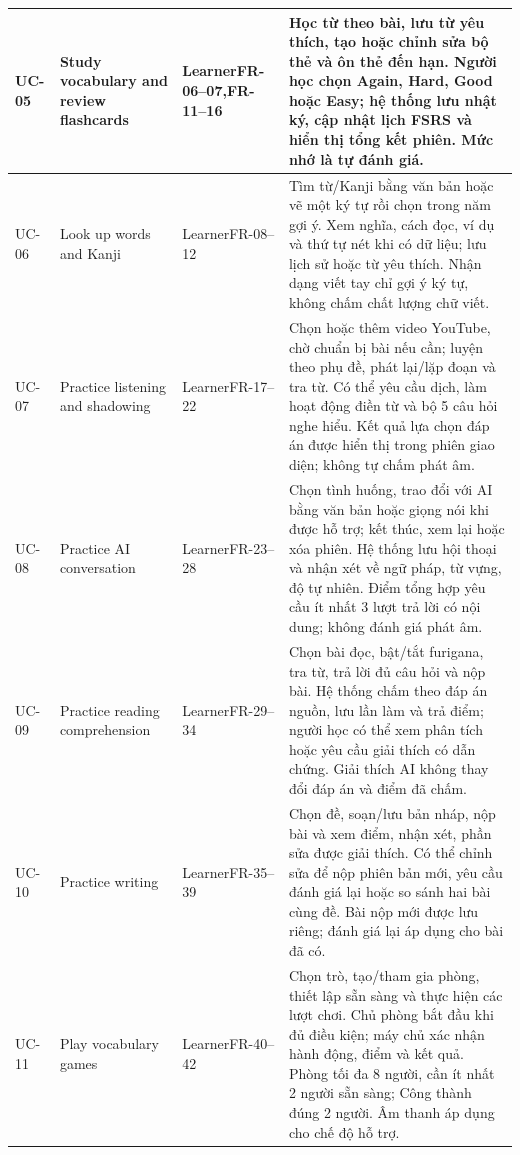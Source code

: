 \begin{longtable}{@{}>{\raggedright\arraybackslash}p{1.1cm}>{\raggedright\arraybackslash}p{3.6cm}>{\raggedright\arraybackslash}p{2.1cm}>{\raggedright\arraybackslash}p{7.8cm}@{}}
\midrule
UC-05 & Study vocabulary and review flashcards & Learner\newline FR-06--07,\newline FR-11--16 & Học từ theo bài, lưu từ yêu thích, tạo hoặc chỉnh sửa bộ thẻ và ôn thẻ đến hạn. Người học chọn Again, Hard, Good hoặc Easy; hệ thống lưu nhật ký, cập nhật lịch FSRS và hiển thị tổng kết phiên. Mức nhớ là tự đánh giá. \\
\midrule
UC-06 & Look up words and Kanji & Learner\newline FR-08--12 & Tìm từ/Kanji bằng văn bản hoặc vẽ một ký tự rồi chọn trong năm gợi ý. Xem nghĩa, cách đọc, ví dụ và thứ tự nét khi có dữ liệu; lưu lịch sử hoặc từ yêu thích. Nhận dạng viết tay chỉ gợi ý ký tự, không chấm chất lượng chữ viết. \\
\midrule
UC-07 & Practice listening and shadowing & Learner\newline FR-17--22 & Chọn hoặc thêm video YouTube, chờ chuẩn bị bài nếu cần; luyện theo phụ đề, phát lại/lặp đoạn và tra từ. Có thể yêu cầu dịch, làm hoạt động điền từ và bộ 5 câu hỏi nghe hiểu. Kết quả lựa chọn đáp án được hiển thị trong phiên giao diện; không tự chấm phát âm. \\
\midrule
UC-08 & Practice AI conversation & Learner\newline FR-23--28 & Chọn tình huống, trao đổi với AI bằng văn bản hoặc giọng nói khi được hỗ trợ; kết thúc, xem lại hoặc xóa phiên. Hệ thống lưu hội thoại và nhận xét về ngữ pháp, từ vựng, độ tự nhiên. Điểm tổng hợp yêu cầu ít nhất 3 lượt trả lời có nội dung; không đánh giá phát âm. \\
\midrule
UC-09 & Practice reading comprehension & Learner\newline FR-29--34 & Chọn bài đọc, bật/tắt furigana, tra từ, trả lời đủ câu hỏi và nộp bài. Hệ thống chấm theo đáp án nguồn, lưu lần làm và trả điểm; người học có thể xem phân tích hoặc yêu cầu giải thích có dẫn chứng. Giải thích AI không thay đổi đáp án và điểm đã chấm. \\
\midrule
UC-10 & Practice writing & Learner\newline FR-35--39 & Chọn đề, soạn/lưu bản nháp, nộp bài và xem điểm, nhận xét, phần sửa được giải thích. Có thể chỉnh sửa để nộp phiên bản mới, yêu cầu đánh giá lại hoặc so sánh hai bài cùng đề. Bài nộp mới được lưu riêng; đánh giá lại áp dụng cho bài đã có. \\
\midrule
UC-11 & Play vocabulary games & Learner\newline FR-40--42 & Chọn trò, tạo/tham gia phòng, thiết lập sẵn sàng và thực hiện các lượt chơi. Chủ phòng bắt đầu khi đủ điều kiện; máy chủ xác nhận hành động, điểm và kết quả. Phòng tối đa 8 người, cần ít nhất 2 người sẵn sàng; Công thành đúng 2 người. Âm thanh áp dụng cho chế độ hỗ trợ. \\
\end{longtable}
\endgroup
